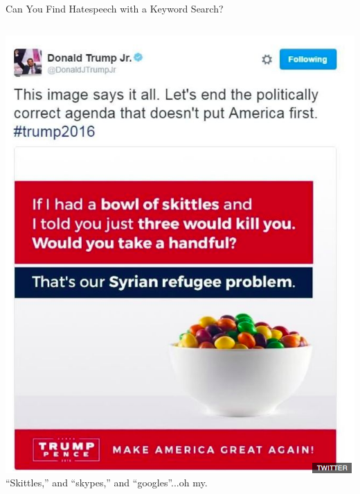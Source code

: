 \documentclass[nobackground,dvipsnames,table,aspectratio=169]{beamer}
\begin{document}
\begin{frame}{Can You Find Hatespeech with a Keyword Search?}
    \begin{columns}
            \includegraphics[width=\textwidth]{skittles}
             \LARGE
             \centering
             “Skittles,” and “skypes,” and “googles”...oh my.
    \end{columns}
\end{frame}
\end{document}

